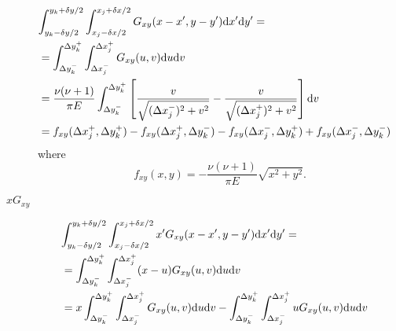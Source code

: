 \documentclass{article}
\newcommand{\dd}{\mathrm{d}}
\begin{document}
\begin{description}
\begin{align}
\lefteqn{
\int_{y_k-\delta y/2}^{y_k+\delta y/2}  \int_{x_j-\delta x/2}^{x_j+\delta x/2} G_{xy}(x-x',y-y')\dd x'  \dd y'= } \nonumber\\
&= \int_{\Delta y_{k}^-}^{\Delta y_k^+}  \int_{\Delta x_j^-}^{\Delta x_j^+} G_{xy}(u,v)\dd u \dd v \nonumber\\
&=\frac{\nu(\nu+1)}{\pi E}\int_{\Delta y_{k}^-}^{\Delta y_k^+} \left[ \frac{v}{\sqrt{(\Delta x_j^-)^2 + v^2}} -\frac{v}{\sqrt{(\Delta x_j^+)^2+ v^2}}\right] \dd v \nonumber\\
&= f_{xy}(\Delta x_j^+,\Delta y_k^+) - f_{xy} (\Delta x_j^+,\Delta y_k^-)  - f_{xy}(\Delta x_j^-, \Delta y_k^+) +f_{xy}(\Delta x_j^-,\Delta y_k^-) 
\end{align}
where
\begin{equation}
f_{xy}(x,y) =-\frac{\nu(\nu+1)}{\pi E} \sqrt{ x^2+y^2}.
\end{equation}

\item[$xG_{xy}$]

\begin{align}
\lefteqn{
\int_{y_k-\delta y/2}^{y_k+\delta y/2}  \int_{x_j-\delta x/2}^{x_j+\delta x/2} x'G_{xy}(x-x',y-y')\dd x'  \dd y'= } \nonumber\\
&= \int_{\Delta y_{k}^-}^{\Delta y_k^+}  \int_{\Delta x_j^-}^{\Delta x_j^+} (x-u)G_{xy}(u,v)\dd u \dd v \nonumber\\
&=x\int_{\Delta y_{k}^-}^{\Delta y_k^+}  \int_{\Delta x_j^-}^{\Delta x_j^+} G_{xy}(u,v)\dd u \dd v - \int_{\Delta y_{k}^-}^{\Delta y_k^+}  \int_{\Delta x_j^-}^{\Delta x_j^+} uG_{xy}(u,v)\dd u \dd v 
\end{align}


\end{description}
\end{document}
